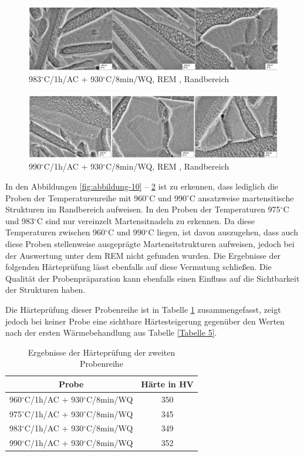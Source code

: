 \begin{figure}
	\centering
	\includegraphics[width=1.0\linewidth]{./Bilder/Abbildung 12.png}
	\caption[Abbildung 12]{983$^\circ$C/1h/AC + 930$^\circ$C/8min/WQ, REM , Randbereich}
	\label{fig:abbildung-12}
\end{figure}

\begin{figure}
	\centering
	\includegraphics[width=1.0\linewidth]{./Bilder/Abbildung 13.png}
	\caption[Abbildung 13]{990$^\circ$C/1h/AC + 930$^\circ$C/8min/WQ, REM , Randbereich}
	\label{fig:abbildung-13}
\end{figure}

In den Abbildungen \ref{fig:abbildung-10} -- \ref{fig:abbildung-13} ist zu erkennen, dass lediglich die Proben der Temperaturenreihe mit 960$^\circ$C und 990$^\circ$C ansatzweise martensitische Strukturen im Randbereich aufweisen. In den Proben der Temperaturen 975$^\circ$C und 983$^\circ$C sind nur vereinzelt Martensitnadeln zu erkennen. Da diese Temperaturen zwischen 960$^\circ$C und 990$^\circ$C liegen, ist davon auszugehen, dass auch diese Proben stellenweise ausgeprägte Martensitstrukturen aufweisen, jedoch bei der Auswertung unter dem REM nicht gefunden wurden. Die Ergebnisse der folgenden Härteprüfung lässt ebenfalls auf diese Vermutung schließen. Die Qualität der Probenpräparation kann ebenfalls einen Einfluss auf die Sichtbarkeit der Strukturen haben.

Die Härteprüfung dieser Probenreihe ist in Tabelle \ref{Tabelle 6} zusammengefasst, zeigt jedoch bei keiner Probe eine sichtbare Härtesteigerung gegenüber den Werten nach der ersten Wärmebehandlung aus Tabelle \ref{Tabelle 5}.

\begin{table}[h]
	\centering
	\begin{tabular}{|c|c|}
		\hline 
		Probe & Härte in HV \\ 
		\hline 
		960$^\circ$C/1h/AC + 930$^\circ$C/8min/WQ & 350 \\ 
		\hline 
		975$^\circ$C/1h/AC + 930$^\circ$C/8min/WQ & 345 \\ 
		\hline 
		983$^\circ$C/1h/AC + 930$^\circ$C/8min/WQ & 349 \\ 
		\hline 
		990$^\circ$C/1h/AC + 930$^\circ$C/8min/WQ & 352 \\ 
		\hline 
	\end{tabular} 
	\caption{Ergebnisse der Härteprüfung der zweiten Probenreihe}
	\label{Tabelle 6}
\end{table}

